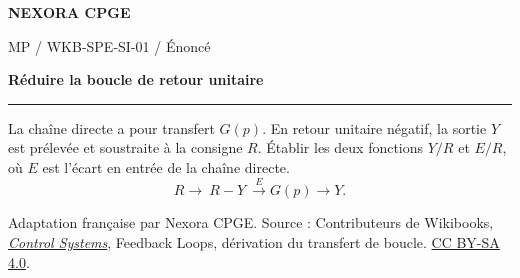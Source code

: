 \documentclass[11pt,a4paper]{article}
\begin{document}
{\small\bfseries\color{nexorablue} NEXORA CPGE}\par
{\small MP / WKB-SPE-SI-01 / Énoncé}\par
{\LARGE\bfseries Réduire la boucle de retour unitaire}\par
\vspace{0.25em}\hrule\vspace{0.6em}

La chaîne directe a pour transfert $G(p)$. En retour unitaire négatif, la sortie $Y$ est prélevée et soustraite à la consigne $R$. Établir les deux fonctions $Y/R$ et $E/R$, où $E$ est l’écart en entrée de la chaîne directe.
\[ R\longrightarrow\boxed{\ R-Y\ }\overset{E}{\longrightarrow}\boxed{G(p)}\longrightarrow Y. \]

\bigskip
{\footnotesize Adaptation française par Nexora CPGE. Source : Contributeurs de Wikibooks,
\href{https://en.wikibooks.org/wiki/Control_Systems/Feedback_Loops\#Feedback_Loop_Transfer_Function}{\textit{Control Systems}}, Feedback Loops, dérivation du transfert de boucle.
\href{https://creativecommons.org/licenses/by-sa/4.0/}{CC BY-SA 4.0}.}
\end{document}
